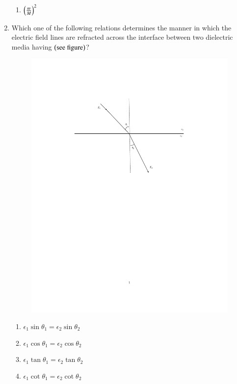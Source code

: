 \documentclass[journal,12pt,onecolumn,article]{IEEEtran}
\theoremstyle{remark}
\begin{document}
\begin{enumerate}
\begin{enumerate}
			\item $\left(\frac{m}{M}\right)^2$
		\end{enumerate}
	\item Which one of the following relations determines the manner in which the electric field lines are refracted across the interface between two dielectric media having $\left(\text{see figure}\right)$?
		\vspace{-100pt}	
		\begin{figure}[H]
	\centering
				\begin{minipage}{1\textwidth}
	\includegraphics[width=0.7\linewidth]{figs/fig13/fig13.pdf}
			\end{minipage}
			\end{figure}
			\vspace{-200pt}


		\begin{enumerate}
			\item $\epsilon_1 \sin{\theta_1}=\epsilon_2 \sin{\theta_2}$
			\item $\epsilon_1 \cos{\theta_1} = \epsilon_2 \cos{\theta_2}$
			\item $\epsilon_1 \tan{\theta_1} = \epsilon_2 \tan{\theta_2}$
			\item $\epsilon_1 \cot{\theta_1} = \epsilon_2 \cot{\theta_2}$
		\end{enumerate}
\end{enumerate}
\end{document}
